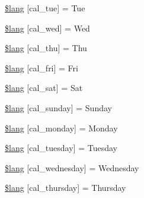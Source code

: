 \begin{DoxyCompactItemize}
\item 
\hyperlink{_admin_2system_2language_2english_2calendar__lang_8php_ad6b1b4ce855d9ed3f88dc4e7e71f5248}{\$lang} \mbox{[}\textquotesingle{}cal\+\_\+tue\textquotesingle{}\mbox{]} = \textquotesingle{}Tue\textquotesingle{}
\item 
\hyperlink{_admin_2system_2language_2english_2calendar__lang_8php_a94d7b85acb850c5930399c9099b22412}{\$lang} \mbox{[}\textquotesingle{}cal\+\_\+wed\textquotesingle{}\mbox{]} = \textquotesingle{}Wed\textquotesingle{}
\item 
\hyperlink{_admin_2system_2language_2english_2calendar__lang_8php_af49921f5f0bcc54c07efed2cf4b71e01}{\$lang} \mbox{[}\textquotesingle{}cal\+\_\+thu\textquotesingle{}\mbox{]} = \textquotesingle{}Thu\textquotesingle{}
\item 
\hyperlink{_admin_2system_2language_2english_2calendar__lang_8php_abfe2cd9d203b296392f657caf8488b53}{\$lang} \mbox{[}\textquotesingle{}cal\+\_\+fri\textquotesingle{}\mbox{]} = \textquotesingle{}Fri\textquotesingle{}
\item 
\hyperlink{_admin_2system_2language_2english_2calendar__lang_8php_aa1dc0204b4066fa35b0760e1437e8194}{\$lang} \mbox{[}\textquotesingle{}cal\+\_\+sat\textquotesingle{}\mbox{]} = \textquotesingle{}Sat\textquotesingle{}
\item 
\hyperlink{_admin_2system_2language_2english_2calendar__lang_8php_ade346ced9dfd91f19b1912bda55ed6b9}{\$lang} \mbox{[}\textquotesingle{}cal\+\_\+sunday\textquotesingle{}\mbox{]} = \textquotesingle{}Sunday\textquotesingle{}
\item 
\hyperlink{_admin_2system_2language_2english_2calendar__lang_8php_a55fb324dcfcabd69cc212d116b6b0254}{\$lang} \mbox{[}\textquotesingle{}cal\+\_\+monday\textquotesingle{}\mbox{]} = \textquotesingle{}Monday\textquotesingle{}
\item 
\hyperlink{_admin_2system_2language_2english_2calendar__lang_8php_a2f395fc42eea1e44a77e77525b266061}{\$lang} \mbox{[}\textquotesingle{}cal\+\_\+tuesday\textquotesingle{}\mbox{]} = \textquotesingle{}Tuesday\textquotesingle{}
\item 
\hyperlink{_admin_2system_2language_2english_2calendar__lang_8php_a85c82aef005144770cf7356945a85819}{\$lang} \mbox{[}\textquotesingle{}cal\+\_\+wednesday\textquotesingle{}\mbox{]} = \textquotesingle{}Wednesday\textquotesingle{}
\item 
\hyperlink{_admin_2system_2language_2english_2calendar__lang_8php_a3ab3ea291fddc8063b57a25cfbc7cf0f}{\$lang} \mbox{[}\textquotesingle{}cal\+\_\+thursday\textquotesingle{}\mbox{]} = \textquotesingle{}Thursday\textquotesingle{}

\end{DoxyCompactItemize}

